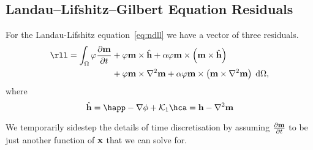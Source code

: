 \subsection{Landau--Lifshitz--Gilbert Equation Residuals}


For the Landau-Lifshitz equation~\eqref{eq:ndll} we have a vector of three residuals.
\begin{equation}
  \begin{aligned}
    \rll = \int_\magd \tbf \dmdt &+ \tbf \mv \times \hat{\hv}
    + \dampc \tbf \mv \times \left( \mv \times \hat{\hv} \right) \\
    &+  \tbf \mv \times \lap \mv
    + \dampc \tbf \mv \times \left(\mv \times \lap \mv\right) \d\magd,
    \label{res:contllg}
  \end{aligned}
\end{equation}
where
\begin{equation}
  \hat{\hv} = \happ - \nabla \phi + \kone \hca = \hv - \lap \mv
\end{equation}

We temporarily sidestep the details of time discretisation by assuming $\frac{\partial \mathbf{m}}{\partial t}$ to be just another function of $\mathbf{x}$ that we can solve for.


